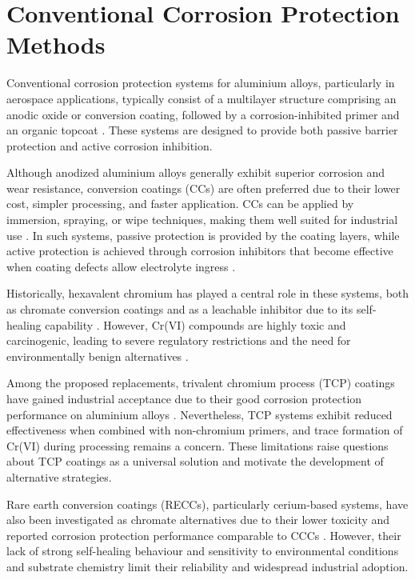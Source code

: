 \documentclass[11pt,twoside,a4paper]{report}
\begin{document}
\section{Conventional Corrosion Protection Methods}

Conventional corrosion protection systems for aluminium alloys, particularly in aerospace applications, typically consist of a multilayer structure comprising an anodic oxide or conversion coating, followed by a corrosion-inhibited primer and an organic topcoat \cite{MartinezViademonte2020}. These systems are designed to provide both passive barrier protection and active corrosion inhibition.

Although anodized aluminium alloys generally exhibit superior corrosion and wear resistance, conversion coatings (CCs) are often preferred due to their lower cost, simpler processing, and faster application. CCs can be applied by immersion, spraying, or wipe techniques, making them well suited for industrial use \cite{Becker2019}. In such systems, passive protection is provided by the coating layers, while active protection is achieved through corrosion inhibitors that become effective when coating defects allow electrolyte ingress \cite{MartinezViademonte2020}.

Historically, hexavalent chromium has played a central role in these systems, both as chromate conversion coatings and as a leachable inhibitor due to its self-healing capability \cite{Beneke2016,BoualiReview2020}. However, Cr(VI) compounds are highly toxic and carcinogenic, leading to severe regulatory restrictions and the need for environmentally benign alternatives \cite{MartinezViademonte2020,BoualiReview2020}.

Among the proposed replacements, trivalent chromium process (TCP) coatings have gained industrial acceptance due to their good corrosion protection performance on aluminium alloys \cite{Becker2019,Qi2015,BoualiReview2020}. Nevertheless, TCP systems exhibit reduced effectiveness when combined with non-chromium primers, and trace formation of Cr(VI) during processing remains a concern. These limitations raise questions about TCP coatings as a universal solution and motivate the development of alternative strategies.

Rare earth conversion coatings (RECCs), particularly cerium-based systems, have also been investigated as chromate alternatives due to their lower toxicity and reported corrosion protection performance comparable to CCCs \cite{Becker2019,Hughes2009,Cohen1995,Lau2009}. However, their lack of strong self-healing behaviour and sensitivity to environmental conditions and substrate chemistry limit their reliability and widespread industrial adoption.
\end{document}

